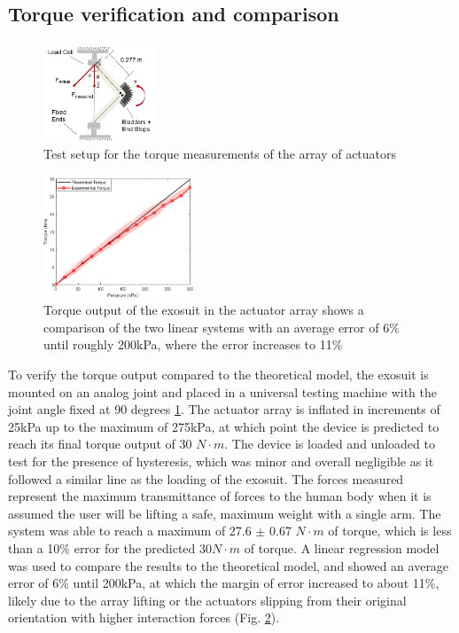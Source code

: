 \documentclass[letterpaper, 10 pt, conference]{ieeeconf}  %
\begin{document}
\subsection{Torque verification and comparison
}

\begin{figure} [b!]
\centering
\includegraphics[width=0.3\textwidth]{torquetest.PNG}
\caption{Test setup for the torque measurements of the array of actuators
}
\label{fig:t_test}
\end{figure}

\begin{figure}
\centering
\includegraphics[width=0.4\textwidth]{Torque_stuff3.PNG}
\caption{Torque output of the exosuit in the actuator array shows a comparison of the two linear systems with an average error of 6\% until roughly 200kPa, where the error increases to 11\%}
\label{fig:torques}
\vspace{-1.5em}
\end{figure}

To verify the torque output compared to the theoretical model, the exosuit is mounted on an analog joint and placed in a universal testing machine with the joint angle fixed at 90 degrees \ref{fig:t_test}. The actuator array is inflated in increments of 25kPa up to the maximum of 275kPa, at which point the device is predicted to reach its final torque output of 30 $N\cdot m$.  The device is loaded and unloaded to test for the presence of hysteresis, which was minor and overall negligible as it followed a similar line as the loading of the exosuit.  The forces measured represent the maximum transmittance of forces to the human body when it is assumed the user will be lifting a safe, maximum weight with a single arm. The system was able to reach a maximum of 27.6 $\pm$ 0.67 $N\cdot m$ of torque, which is less than a 10\% error for the predicted 30$N \cdot m$ of torque. A linear regression model was used to compare the results to the theoretical model, and showed an average error of 6\% until 200kPa, at which the margin of error increased to about 11\%, likely due to the array lifting or the actuators slipping from their original orientation with higher interaction forces (Fig. \ref{fig:torques}).  
\end{document}
